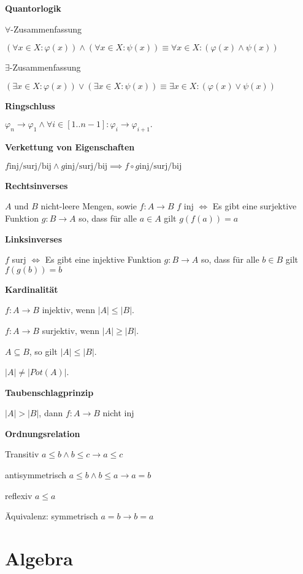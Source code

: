 \documentclass[a4paper,10pt]{article}
\begin{document}
\begin{multicols}{3}
\textbf{Quantorlogik}

$\forall$-Zusammenfassung

$(\forall x \in X: \varphi(x)) \wedge (\forall x \in X: \psi(x)) \equiv \forall x \in X: (\varphi(x) \wedge \psi(x))$

$\exists$-Zusammenfassung

$(\exists x \in X: \varphi(x)) \vee (\exists x \in X: \psi(x)) \equiv \exists x \in X: (\varphi(x) \vee \psi(x))$

\textbf{Ringschluss}

$ \varphi_{n} \rightarrow \varphi_1 \wedge \forall i \in [1..n-1]: \varphi_i \rightarrow \varphi_{i+1}. $

\textbf{Verkettung von Eigenschaften}

$f \text{inj/surj/bij} \land g \text{inj/surj/bij} \implies f\circ g\text{inj/surj/bij}$

\textbf{Rechtsinverses}

$A$ und $B$ nicht-leere Mengen, sowie $f\colon A \rightarrow B$
$f$ inj $\iff$ Es gibt eine surjektive Funktion $g\colon B \rightarrow A$ so, dass für alle $a \in A$ gilt $g(f(a))=a$

\textbf{Linksinverses}

$f$ surj $\iff$ Es gibt eine injektive Funktion $g\colon B \rightarrow A$ so, dass für alle $b \in B$ gilt $f(g(b))=b$

\textbf{Kardinalität}

$f\colon A \rightarrow B$ injektiv, wenn $|A| \leq |B|$.

$f\colon A \rightarrow B$ surjektiv, wenn $|A| \geq |B|$.

$A \subseteq B$, so gilt $|A| \leq |B|$.

$|A| \neq |Pot(A)|$.

\textbf{Taubenschlagprinzip}

$|A| > |B|$, dann $f: A \to B$ nicht inj

\textbf{Ordnungsrelation}

Transitiv $a \leq b \land b \leq c \rightarrow a \leq c$

antisymmetrisch $a \leq b \land b \leq a \rightarrow a=b$

reflexiv $a \leq a$

Äquivalenz: symmetrisch $a = b \rightarrow b = a$

\section{Algebra}


\end{multicols}
\end{document}

